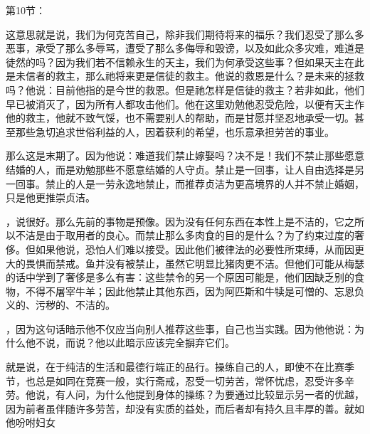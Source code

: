 第10节：\newline{}\par

这意思就是说，我们为何克苦自己，除非我们期待将来的福乐？我们忍受了那么多恶事，承受了那么多辱骂，遭受了那么多侮辱和毁谤，以及如此众多灾难，难道是徒然的吗？因为我们若不信赖永生的天主，我们为何承受这些事？但如果天主在此是未信者的救主，那么祂将来更是信徒的救主。他说的救恩是什么？是未来的拯救吗？他说：目前他指的是今世的救恩。但是祂怎样是信徒的救主？若非如此，他们早已被消灭了，因为所有人都攻击他们。他在这里劝勉他忍受危险，以便有天主作他的救主，他就不致气馁，也不需要别人的帮助，而是甘愿并坚忍地承受一切。甚至那些急切追求世俗利益的人，因着获利的希望，也乐意承担劳苦的事业。\par

那么这是末期了。因为他说：难道我们禁止嫁娶吗？决不是！我们不禁止那些愿意结婚的人，而是劝勉那些不愿意结婚的人守贞。禁止是一回事，让人自由选择是另一回事。禁止的人是一劳永逸地禁止，而推荐贞洁为更高境界的人并不禁止婚姻，只是他更推崇贞洁。\par

，说很好。那么先前的事物是预像。因为没有任何东西在本性上是不洁的，它之所以不洁是由于取用者的良心。而禁止那么多肉食的目的是什么？为了约束过度的奢侈。但如果他说，恐怕人们难以接受。因此他们被律法的必要性所束缚，从而因更大的畏惧而禁戒。鱼并没有被禁止，虽然它明显比猪肉更不洁。但他们可能从梅瑟的话中学到了奢侈是多么有害：这些禁令的另一个原因可能是，他们因缺乏别的食物，不得不屠宰牛羊；因此他禁止其他东西，因为阿匹斯和牛犊是可憎的、忘恩负义的、污秽的、不洁的。\par

，因为这句话暗示他不仅应当向别人推荐这些事，自己也当实践。因为他他说：为什么他不说，而说？他以此暗示应该完全摒弃它们。\par

就是说，在于纯洁的生活和最德行端正的品行。操练自己的人，即使不在比赛季节，也总是如同在竞赛一般，实行斋戒，忍受一切劳苦，常怀忧虑，忍受许多辛劳。他说，有人问，为什么他提到身体的操练？为要通过比较显示另一者的优越，因为前者虽伴随许多劳苦，却没有实质的益处，而后者却有持久且丰厚的善。就如他吩咐妇女\par

